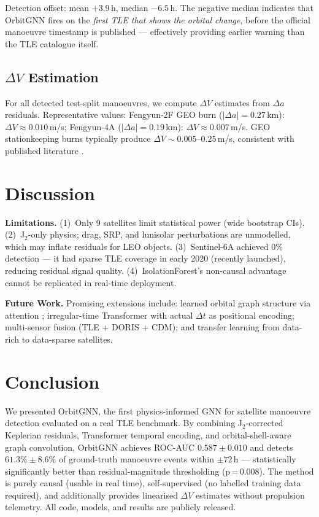\documentclass[conference]{IEEEtran}
\begin{document}
Detection offset: mean $+3.9$\,h, median $-6.5$\,h. The negative
median indicates that OrbitGNN fires on the \emph{first TLE that shows
the orbital change}, before the official manoeuvre timestamp is
published — effectively providing earlier warning than the TLE
catalogue itself.

\subsection{$\Delta V$ Estimation}

For all detected test-split manoeuvres, we compute $\Delta V$ estimates
from $\Delta a$ residuals. Representative values:
Fengyun-2F GEO burn ($|\Delta a| = 0.27$\,km): $\Delta V \approx 0.010$\,m/s;
Fengyun-4A ($|\Delta a| = 0.19$\,km): $\Delta V \approx 0.007$\,m/s.
GEO stationkeeping burns typically produce $\Delta V \sim 0.005$--$0.25$\,m/s,
consistent with published literature \cite{vallado2013}.

\section{Discussion}
\label{sec:discuss}

\textbf{Limitations.}
(1)~Only 9 satellites limit statistical power (wide bootstrap CIs).
(2)~J$_2$-only physics; drag, SRP, and lunisolar perturbations are
unmodelled, which may inflate residuals for LEO objects.
(3)~Sentinel-6A achieved 0\% detection — it had sparse TLE coverage
in early 2020 (recently launched), reducing residual signal quality.
(4)~IsolationForest's non-causal advantage cannot be replicated in
real-time deployment.

\textbf{Future Work.}
Promising extensions include: learned orbital graph structure via
attention \cite{nguyen2022}; irregular-time Transformer with actual
$\Delta t$ as positional encoding; multi-sensor fusion (TLE + DORIS +
CDM); and transfer learning from data-rich to data-sparse satellites.

\section{Conclusion}
\label{sec:conclusion}

We presented OrbitGNN, the first physics-informed GNN for satellite
manoeuvre detection evaluated on a real TLE benchmark. By combining
J$_2$-corrected Keplerian residuals, Transformer temporal encoding, and
orbital-shell-aware graph convolution, OrbitGNN achieves ROC-AUC
$0.587 \pm 0.010$ and detects $61.3\% \pm 8.6\%$ of ground-truth
manoeuvre events within $\pm72$\,h — statistically significantly better
than residual-magnitude thresholding (p\,=\,0.008). The method is
purely causal (usable in real time), self-supervised (no labelled
training data required), and additionally provides linearised $\Delta V$
estimates without propulsion telemetry. All code, models, and results
are publicly released.
\end{document}
